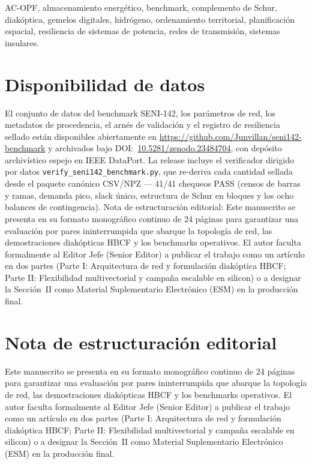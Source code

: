 \documentclass[11pt, journal, onecolumn]{IEEEtran}
\begin{document}
\begin{IEEEkeywords}
AC-OPF, almacenamiento energético, benchmark, complemento de Schur, diakóptica, gemelos digitales, hidrógeno, ordenamiento territorial, planificación espacial, resiliencia de sistemas de potencia, redes de transmisión, sistemas insulares.
\end{IEEEkeywords}









\section*{Disponibilidad de datos}
El conjunto de datos del benchmark SENI-142, los parámetros de red, los metadatos de procedencia, el arnés de validación y el registro de resiliencia sellado están disponibles abiertamente en \url{https://github.com/Junvillan/seni142-benchmark} y archivados bajo DOI:~\href{https://doi.org/10.5281/zenodo.23484704}{10.5281/zenodo.23484704}, con depósito archivístico espejo en IEEE DataPort. La release incluye el verificador dirigido por datos \texttt{verify\_seni142\_benchmark.py}, que re-deriva cada cantidad sellada desde el paquete canónico CSV/NPZ --- 41/41 chequeos PASS (censos de barras y ramas, demanda pico, slack único, estructura de Schur en bloques y los ocho balances de contingencia). Nota de estructuración editorial: Este manuscrito se presenta en su formato monográfico continuo de 24 páginas para garantizar una evaluación por pares ininterrumpida que abarque la topología de red, las demostraciones diakópticas HBCF y los benchmarks operativos. El autor faculta formalmente al Editor Jefe (Senior Editor) a publicar el trabajo como un artículo en dos partes (Parte I: Arquitectura de red y formulación diakóptica HBCF; Parte II: Flexibilidad multivectorial y campaña escalable en silicon) o a designar la Sección~II como Material Suplementario Electrónico (ESM) en la producción final.

\section*{Nota de estructuración editorial}
Este manuscrito se presenta en su formato monográfico continuo de 24 páginas para garantizar una evaluación por pares ininterrumpida que abarque la topología de red, las demostraciones diakópticas HBCF y los benchmarks operativos. El autor faculta formalmente al Editor Jefe (Senior Editor) a publicar el trabajo como un artículo en dos partes (Parte I: Arquitectura de red y formulación diakóptica HBCF; Parte II: Flexibilidad multivectorial y campaña escalable en silicon) o a designar la Sección~II como Material Suplementario Electrónico (ESM) en la producción final.
\end{document}
